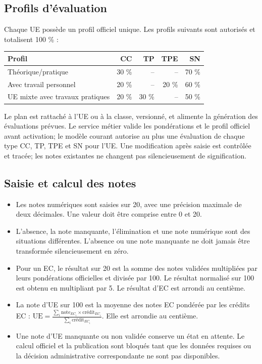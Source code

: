 \documentclass[11pt,a4paper]{article}
\begin{document}
\subsection{Profils d'évaluation}
Chaque UE possède un profil officiel unique. Les profils suivants sont autorisés et totalisent 100 \% :
\begin{center}
\begin{tabularx}{0.9\textwidth}{Yrrrr}
\toprule
\textbf{Profil} & \textbf{CC} & \textbf{TP} & \textbf{TPE} & \textbf{SN} \\
\midrule
Théorique/pratique & 30 \% & -- & -- & 70 \% \\
Avec travail personnel & 20 \% & -- & 20 \% & 60 \% \\
UE mixte avec travaux pratiques & 20 \% & 30 \% & -- & 50 \% \\
\bottomrule
\end{tabularx}
\end{center}
Le plan est rattaché à l’UE ou à la classe, versionné, et alimente la génération des évaluations prévues. Le service métier valide les pondérations et le profil officiel avant activation; le modèle courant autorise au plus une évaluation de chaque type CC, TP, TPE et SN pour l’UE. Une modification après saisie est contrôlée et tracée; les notes existantes ne changent pas silencieusement de signification.

\subsection{Saisie et calcul des notes}
\begin{itemize}
  \item Les notes numériques sont saisies sur 20, avec une précision maximale de deux décimales. Une valeur doit être comprise entre 0 et 20.
  \item L'absence, la note manquante, l'élimination et une note numérique sont des situations différentes. L'absence ou une note manquante ne doit jamais être transformée silencieusement en zéro.
  \item Pour un EC, le résultat sur 20 est la somme des notes validées multipliées par leurs pondérations officielles et divisée par 100. Le résultat normalisé sur 100 est obtenu en multipliant par 5. Le résultat d'EC est arrondi au centième.
  \item La note d'UE sur 100 est la moyenne des notes EC pondérée par les crédits EC : \(\mathrm{UE}=\frac{\sum_i \text{note}_{EC_i}\times\text{crédit}_{EC_i}}{\sum_i \text{crédit}_{EC_i}}\). Elle est arrondie au centième.
  \item Une note d'UE manquante ou non validée conserve un état en attente. Le calcul officiel et la publication sont bloqués tant que les données requises ou la décision administrative correspondante ne sont pas disponibles.
\end{itemize}
\end{document}
